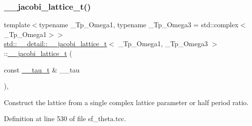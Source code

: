 \subsubsection{\texorpdfstring{\+\_\+\+\_\+jacobi\+\_\+lattice\+\_\+t()}{\_\_jacobi\_lattice\_t()}\hspace{0.1cm}{\footnotesize\ttfamily [2/3]}}
{\footnotesize\ttfamily template$<$typename \+\_\+\+Tp\+\_\+\+Omega1, typename \+\_\+\+Tp\+\_\+\+Omega3 = std\+::complex$<$\+\_\+\+Tp\+\_\+\+Omega1$>$$>$ \\
\hyperlink{structstd_1_1____detail_1_1____jacobi__lattice__t}{std\+::\+\_\+\+\_\+detail\+::\+\_\+\+\_\+jacobi\+\_\+lattice\+\_\+t}$<$ \+\_\+\+Tp\+\_\+\+Omega1, \+\_\+\+Tp\+\_\+\+Omega3 $>$\+::\hyperlink{structstd_1_1____detail_1_1____jacobi__lattice__t}{\+\_\+\+\_\+jacobi\+\_\+lattice\+\_\+t} (\begin{DoxyParamCaption}\item[{const \hyperlink{structstd_1_1____detail_1_1____jacobi__lattice__t_1_1____tau__t}{\+\_\+\+\_\+tau\+\_\+t} \&}]{\+\_\+\+\_\+tau }\end{DoxyParamCaption})\hspace{0.3cm}{\ttfamily [inline]}, {\ttfamily [explicit]}}



Construct the lattice from a single complex lattice parameter or half period ratio. 



Definition at line 530 of file sf\+\_\+theta.\+tcc.

\mbox{\label{structstd_1_1____detail_1_1____jacobi__lattice__t_a0ee07a6d4ef66a0b1561f1041183b836}} 
